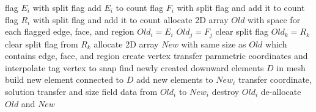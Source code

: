 \documentclass{article}
\begin{document}
\begin{algorithm}[H]
\caption{Refine}
\begin{algorithmic}[1]
        \State flag $E_i$ with split flag
    \EndIf
\EndFor
{} 
        \State add $E_i$ to count
             
                \State flag $F_i$ with split flag and add it to count
                        \State flag $R_i$ with split flag and add it to count 
                    \EndIf
                \EndFor
            \EndIf
        \EndFor
    \EndIf
\EndFor
\State allocate 2D array $Old$ with space for each flagged edge, face, and region
 
        \State $Old_{i} = E_i$ 
             
                \State $Old_{j} = F_j$
                \State clear split flag
                 
                        \State $Old_{k} = R_k$
                        \State clear split flag from $R_k$
                    \EndIf
                \EndFor
            \EndIf
        \EndFor
    \EndIf
\EndFor
\State allocate 2D array $New$ with same size as $Old$ which contains edge, face, and region
        \State create vertex
        \State transfer parametric coordinates and interpolate
        \State tag vertex to snap
    \Else
        \State find newly created downward elements $D$ in mesh
        \State build new element connected to $D$
    \EndIf
    \State add new elements to $New_i$
\EndFor
{}
    \State transfer coordinate, solution transfer and size field data from $Old_i$ to $New_i$
\EndFor
{}
    \State destroy $Old_i$
\EndFor
\State de-allocate $Old$ and $New$

\end{algorithmic}
\end{algorithm}
\end{document}
